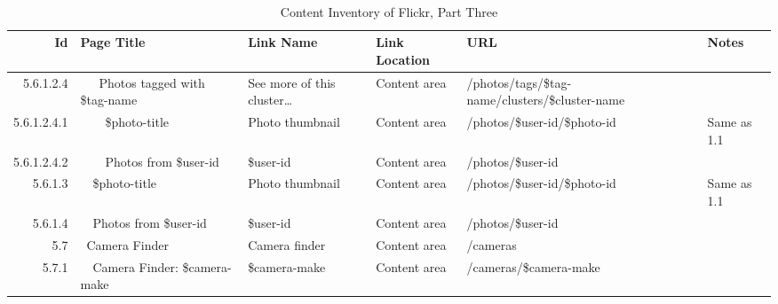 \documentclass[12pt,a4paper]{article}
\begin{document}
\begin{landscape}
  \begin{table}[h!b!p!]
    \caption{Content Inventory of Flickr, Part Three}
    \label{table:flickr.content.inventory.3}
    \begin{center}
      \begin{tiny}
        \tt
        \begin{tabular}{r|l|l|l|l|p{3cm}}
            Id &
            Page Title &
            Link Name &
            Link Location &
            URL &
            Notes \\

            \hline

                    5.6.1.2.4 &
                    ~~~Photos tagged with \$tag-name &
                    See more of this cluster\ldots &
                    Content area &
                    /photos/tags/\$tag-name/clusters/\$cluster-name &
                    \\

                      5.6.1.2.4.1 &
                      ~~~~\$photo-title &
                      Photo thumbnail &
                      Content area &
                      /photos/\$user-id/\$photo-id &
                      Same as 1.1 \\

                      5.6.1.2.4.2 &
                      ~~~~Photos from \$user-id &
                      \$user-id &
                      Content area &
                      /photos/\$user-id &
                      \\

                  5.6.1.3 &
                  ~~\$photo-title &
                  Photo thumbnail &
                  Content area &
                  /photos/\$user-id/\$photo-id &
                  Same as 1.1 \\

                  5.6.1.4 &
                  ~~Photos from \$user-id &
                  \$user-id &
                  Content area &
                  /photos/\$user-id &
                  \\

              5.7 &
              ~Camera Finder &
              Camera finder &
              Content area &
              /cameras &
              \\

                5.7.1 &
                ~~Camera Finder: \$camera-make &
                \$camera-make &
                Content area &
                /cameras/\$camera-make &
                \\


\end{tabular}
\end{tiny}
\end{center}
\end{table}
\end{landscape}
\end{document}
